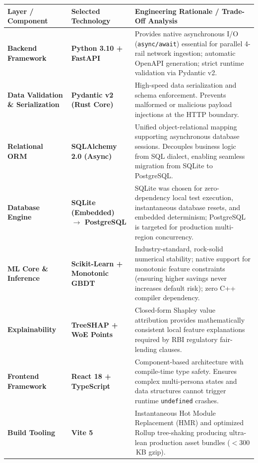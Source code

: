 \documentclass[11pt,a4paper,oneside]{report}
\begin{document}
\begin{table}[H]
\centering
\small
\renewcommand{\arraystretch}{1.2}
\begin{tabularx}{\textwidth}{p{2.8cm} p{3.2cm} X}
  \toprule
  \textbf{Layer / Component} & \textbf{Selected Technology} & \textbf{Engineering Rationale / Trade-Off Analysis} \\
  \midrule
  \textbf{Backend Framework} & \textbf{Python 3.10 + FastAPI} & Provides native asynchronous I/O (\texttt{async/await}) essential for parallel 4-rail network ingestion; automatic OpenAPI generation; strict runtime validation via Pydantic v2. \\
  \addlinespace
  \textbf{Data Validation \& Serialization} & \textbf{Pydantic v2 (Rust Core)} & High-speed data serialization and schema enforcement. Prevents malformed or malicious payload injections at the HTTP boundary. \\
  \addlinespace
  \textbf{Relational ORM} & \textbf{SQLAlchemy 2.0 (Async)} & Unified object-relational mapping supporting asynchronous database sessions. Decouples business logic from SQL dialect, enabling seamless migration from SQLite to PostgreSQL. \\
  \addlinespace
  \textbf{Database Engine} & \textbf{SQLite (Embedded) $\rightarrow$ PostgreSQL} & SQLite was chosen for zero-dependency local test execution, instantaneous database resets, and embedded determinism; PostgreSQL is targeted for production multi-region concurrency. \\
  \addlinespace
  \textbf{ML Core \& Inference} & \textbf{Scikit-Learn + Monotonic GBDT} & Industry-standard, rock-solid numerical stability; native support for monotonic feature constraints (ensuring higher savings never increases default risk); zero C++ compiler dependency. \\
  \addlinespace
  \textbf{Explainability} & \textbf{TreeSHAP + WoE Points} & Closed-form Shapley value attribution provides mathematically consistent local feature explanations required by RBI regulatory fair-lending clauses. \\
  \addlinespace
  \textbf{Frontend Framework} & \textbf{React 18 + TypeScript} & Component-based architecture with compile-time type safety. Ensures complex multi-persona states and data structures cannot trigger runtime \texttt{undefined} crashes. \\
  \addlinespace
  \textbf{Build Tooling} & \textbf{Vite 5} & Instantaneous Hot Module Replacement (HMR) and optimized Rollup tree-shaking producing ultra-lean production asset bundles ($<300$\,KB gzip). \\

\end{tabularx}
\end{table}
\end{document}
